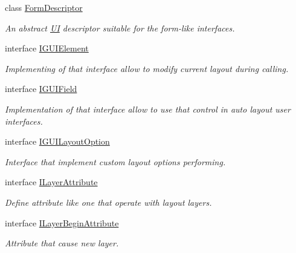 \begin{DoxyCompactItemize}
\item 
class \mbox{\hyperlink{class_wpf_handler_1_1_u_i_1_1_auto_layout_1_1_form_descriptor}{Form\+Descriptor}}
\begin{DoxyCompactList}\small\item\em An abstract \mbox{\hyperlink{namespace_wpf_handler_1_1_u_i}{UI}} descriptor suitable for the form-\/like interfaces. \end{DoxyCompactList}\item 
interface \mbox{\hyperlink{interface_wpf_handler_1_1_u_i_1_1_auto_layout_1_1_i_g_u_i_element}{I\+G\+U\+I\+Element}}
\begin{DoxyCompactList}\small\item\em Implementing of that interface allow to modify current layout during calling. \end{DoxyCompactList}\item 
interface \mbox{\hyperlink{interface_wpf_handler_1_1_u_i_1_1_auto_layout_1_1_i_g_u_i_field}{I\+G\+U\+I\+Field}}
\begin{DoxyCompactList}\small\item\em Implementation of that interface allow to use that control in auto layout user interfaces. \end{DoxyCompactList}\item 
interface \mbox{\hyperlink{interface_wpf_handler_1_1_u_i_1_1_auto_layout_1_1_i_g_u_i_layout_option}{I\+G\+U\+I\+Layout\+Option}}
\begin{DoxyCompactList}\small\item\em Interface that implement custom layout options performing. \end{DoxyCompactList}\item 
interface \mbox{\hyperlink{interface_wpf_handler_1_1_u_i_1_1_auto_layout_1_1_i_layer_attribute}{I\+Layer\+Attribute}}
\begin{DoxyCompactList}\small\item\em Define attribute like one that operate with layout layers. \end{DoxyCompactList}\item 
interface \mbox{\hyperlink{interface_wpf_handler_1_1_u_i_1_1_auto_layout_1_1_i_layer_begin_attribute}{I\+Layer\+Begin\+Attribute}}
\begin{DoxyCompactList}\small\item\em Attribute that cause new layer. \end{DoxyCompactList}\item 

\end{DoxyCompactItemize}
